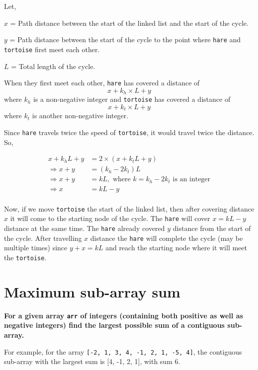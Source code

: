 \documentclass[a4paper,11pt]{book}
\begin{document}
\noindent Let,

 $x$ = Path distance between the start of the linked list and the start of the cycle.

 $y$ = Path distance between the start of the cycle to the point where \lstinline{hare} and \lstinline{tortoise} first meet each other.

 $L$ = Total length of the cycle.

\noindent When they first meet each other, \lstinline{hare} has covered a distance of $$x + k_h\times L + y$$ where $k_h$ is a non-negative integer and \lstinline{tortoise} has covered a distance of $$x + k_t\times L + y$$ where $k_t$ is another non-negative integer.

\noindent Since \lstinline{hare} travels twice the speed of \lstinline{tortoise}, it would travel twice the distance. So,

\begin{align*}
x + k_h L + y &= 2\times (x + k_t L + y)\\
\Rightarrow x + y &= (k_h - 2k_t) L\\
\Rightarrow x + y &= k L, \text{ where } k = k_h - 2k_t \text{ is an integer}\\
\Rightarrow x &= k L - y\\
\end{align*}


\noindent Now, if we move \lstinline{tortoise} the start of the linked list, then after covering distance $x$ it will come to the starting node of the cycle. The \lstinline{hare} will cover $x = k L-y$ distance at the same time. The \lstinline{hare} already covered $y$ distance from the start of the cycle. After travelling $x$ distance the \lstinline{hare} will complete the cycle (may be multiple times) since $y+x=k L$ and reach the starting node where it will meet the \lstinline{tortoise}.

\newpage
\section{Maximum sub-array sum}

\noindent \textbf{For a given array \lstinline{arr} of integers (containing both positive as well as negative integers) find the largest possible sum of a contiguous sub-array.}
\vspace{5mm}

\noindent For example, for the array \lstinline{[-2, 1, 3, 4, -1, 2, 1, -5, 4]}, the contiguous sub-array with the largest sum is [4, -1, 2, 1], with sum 6.
\vspace{5mm}
\end{document}
